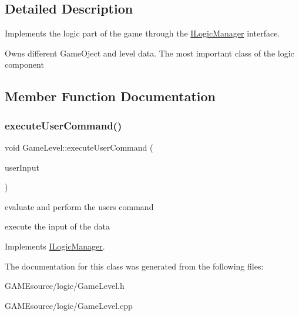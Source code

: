 \subsection{Detailed Description}
Implements the logic part of the game through the \mbox{\hyperlink{class_i_logic_manager}{I\+Logic\+Manager}} interface. 

Owns different Game\+Oject and level data. The most important class of the logic component 

\subsection{Member Function Documentation}
\mbox{\label{class_game_level_a53cd899aa9aeaf3e9579ff32598b0043}} 
\subsubsection{\texorpdfstring{execute\+User\+Command()}{executeUserCommand()}}
{\footnotesize\ttfamily void Game\+Level\+::execute\+User\+Command (\begin{DoxyParamCaption}\item[{User\+Input\+Type}]{user\+Input }\end{DoxyParamCaption})\hspace{0.3cm}{\ttfamily [virtual]}}



evaluate and perform the user\textquotesingle{}s command 

execute the input of the data 

Implements \mbox{\hyperlink{class_i_logic_manager_a531478a93285f5cdf6f22294638b27b3}{I\+Logic\+Manager}}.



The documentation for this class was generated from the following files\+:\begin{DoxyCompactItemize}
\item 
G\+A\+M\+Esource/logic/Game\+Level.\+h\item 
G\+A\+M\+Esource/logic/Game\+Level.\+cpp\end{DoxyCompactItemize}

